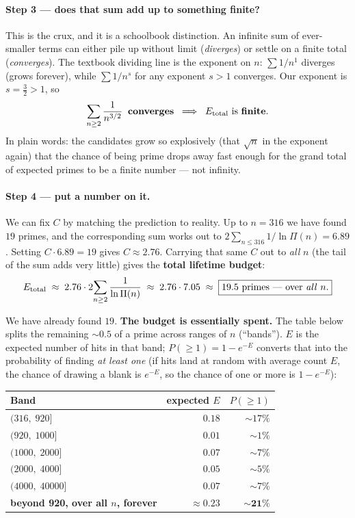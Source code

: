 \documentclass[11pt,a4paper]{article}
\newcommand{\Part}{\Pi}                 %
\begin{document}
\paragraph{Step 3 --- does that sum add up to something finite?}
This is the crux, and it is a schoolbook distinction. An infinite sum of
ever-smaller terms can either pile up without limit (\emph{diverges}) or settle
on a finite total (\emph{converges}). The textbook dividing line is the exponent
on $n$: $\sum 1/n^{1}$ diverges (grows forever), while $\sum 1/n^{s}$ for any
exponent $s>1$ converges. Our exponent is $s=\tfrac32 > 1$, so
\[
  \sum_{n\ge2}\frac{1}{n^{3/2}} \;\;\text{\textbf{converges}} \;\;\Longrightarrow\;\;
  E_{\text{total}} \text{ is \textbf{finite}.}
\]
In plain words: the candidates grow so explosively (that $\sqrt{n}$ in the
exponent again) that the chance of being prime drops away fast enough for the
grand total of expected primes to be a finite number --- not infinity.

\paragraph{Step 4 --- put a number on it.}
We can fix $C$ by matching the prediction to reality. Up to $n=316$ we have found
$19$ primes, and the corresponding sum works out to
$2\sum_{n\le316}1/\ln\Part(n)=6.89$. Setting $C\cdot 6.89 = 19$ gives
$C\approx2.76$. Carrying that same $C$ out to \emph{all} $n$ (the tail of the sum
adds very little) gives the \textbf{total lifetime budget}:
\[
  E_{\text{total}}
  \;\approx\; 2.76\cdot 2\!\sum_{n\ge2}\frac{1}{\ln\Part(n)}
  \;\approx\; 2.76\cdot 7.05
  \;\approx\; \boxed{19.5\text{ primes --- over \emph{all} } n.}
\]

We have already found $19$. \textbf{The budget is essentially spent.} The table
below splits the remaining ${\sim}0.5$ of a prime across ranges of $n$ (``bands'').
$E$ is the expected number of hits in that band; $P(\ge1)=1-e^{-E}$ converts that
into the probability of finding \emph{at least one} (if hits land at random with
average count $E$, the chance of drawing a blank is $e^{-E}$, so the chance of
one or more is $1-e^{-E}$):

\begin{center}
\begin{tabular}{@{}lrr@{}}
\toprule
\textbf{Band} & \textbf{expected $E$} & \textbf{$P(\ge1)$}\\
\midrule
$(316,\;920]$      & $0.18$ & ${\sim}17\%$\\
$(920,\;1000]$     & $0.01$ & ${\sim}1\%$\\
$(1000,\;2000]$    & $0.07$ & ${\sim}7\%$\\
$(2000,\;4000]$    & $0.05$ & ${\sim}5\%$\\
$(4000,\;40000]$   & $0.07$ & ${\sim}7\%$\\
\midrule
\rowcolor{gray!15}
\textbf{beyond 920, over all $n$, forever} & $\mathbf{\approx 0.23}$ & $\mathbf{{\sim}21\%}$\\
\bottomrule
\end{tabular}
\end{center}
\end{document}

